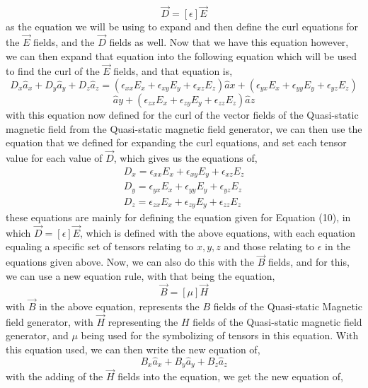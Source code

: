 \documentclass[]{article}
\begin{document}
\begin{equation}
\vec{D} = [\epsilon]\vec{E}
\end{equation}
as the equation we will be using to expand and then define the curl equations for the $\vec{E}$ fields, and the $\vec{D}$ fields as well. Now that we have this equation however, we can then expand that equation into the following equation which will be used to find the curl of the $\vec{E}$ fields, and that equation is,
\[D_x \hat{a}_x + D_y \hat{a}_y + D_z \hat{a}_z = (\epsilon_{xx} E_x + \epsilon_{xy}E_y + \epsilon_{xz}E_z)\hat{a}x+(\epsilon_{yx}E_x + \epsilon_{yy}E_y + \epsilon_{yz}E_z) \]
\[\hat{a}y + (\epsilon_{zx}E_x + \epsilon_{zy}E_y + \epsilon_{zz}E_z)\hat{a}z\]
\linebreak
with this equation now defined for the curl of the vector fields of the Quasi-static magnetic field from the Quasi-static magnetic field generator, we can then use the equation that we defined for expanding the curl equations, and set each tensor value for each value of $\vec{D}$, which gives us the equations of,
\begin{equation}
\begin{array}{c}
D_x = \epsilon_{xx} E_x + \epsilon_{xy}E_y + \epsilon_{xz}E_z\\
D_y = \epsilon_{yx} E_x + \epsilon_{yy}E_y + \epsilon_{yz}E_z \\
D_z = \epsilon_{zx} E_x + \epsilon_{zy}E_y + \epsilon_{zz}E_z
\end{array}
\end{equation}
these equations are mainly for defining the equation given for Equation (10), in which $\vec{D} = [\epsilon] \vec{E}$, which is defined with the above equations, with each equation equaling a specific set of tensors relating to $x, y, z$ and those relating to $\epsilon$ in the equations given above. Now, we can also do this with the $\vec{B}$ fields, and for this, we can use a new equation rule, with that being the equation,
\begin{equation}
\vec{B} = [\mu]\vec{H}
\end{equation}
with $\vec{B}$ in the above equation, represents the $B$ fields of the Quasi-static Magnetic field generator, with $\vec{H}$ representing the $H$ fields of the Quasi-static magnetic field generator, and $\mu$ being used for the symbolizing of tensors in this equation. With this equation used, we can then write the new equation of,
\[B_x\hat{a}_x + B_y\hat{a}_y+B_z\hat{a}_z\]
with the adding of the $\vec{H}$ fields into the equation, we get the new equation of,
\end{document}

